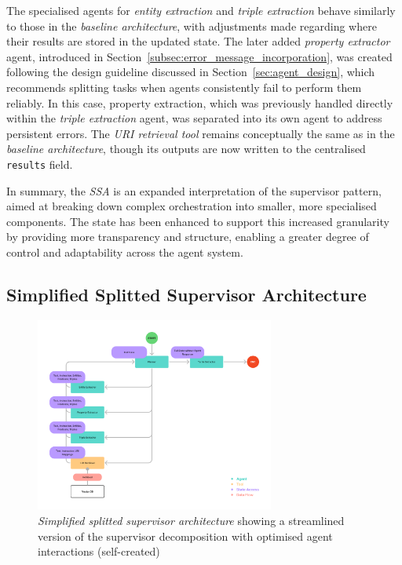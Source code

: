 \documentclass[a4paper,oneside,bibliography=totoc]{scrbook}
\begin{document}
The specialised agents for \textit{entity extraction} and \textit{triple extraction} behave similarly to those in the \textit{baseline architecture}, with adjustments made regarding where their results are stored in the updated state. The later added \textit{property extractor} agent, introduced in Section~\ref{subsec:error_message_incorporation}, was created following the design guideline discussed in Section~\ref{sec:agent_design}, which recommends splitting tasks when agents consistently fail to perform them reliably. In this case, property extraction, which was previously handled directly within the \textit{triple extraction} agent, was separated into its own agent to address persistent errors. The \textit{\ac{URI} retrieval tool} remains conceptually the same as in the \textit{baseline architecture}, though its outputs are now written to the centralised \texttt{results} field. \pagebreak[4]

In summary, the \textit{\ac{SSA}} is an expanded interpretation of the supervisor pattern, aimed at breaking down complex orchestration into smaller, more specialised components. The state has been enhanced to support this increased granularity by providing more transparency and structure, enabling a greater degree of control and adaptability across the agent system.

\subsection{Simplified Splitted Supervisor Architecture}
\label{subsec:simplified_splitted_supervisor}

\begin{figure}[tp]
  \centering
  \includegraphics[width=0.7\textwidth]{figures/Simplified Splitted Supervisor Architecture.png}
  \caption[\textit{Simplified splitted supervisor architecture} showing a streamlined version of the supervisor decomposition with optimised agent interactions]{\textit{Simplified splitted supervisor architecture} showing a streamlined version of the supervisor decomposition with optimised agent interactions (self-created)}
  \label{fig:simplified_splitted_supervisor_architecture}
\end{figure}
\end{document}
